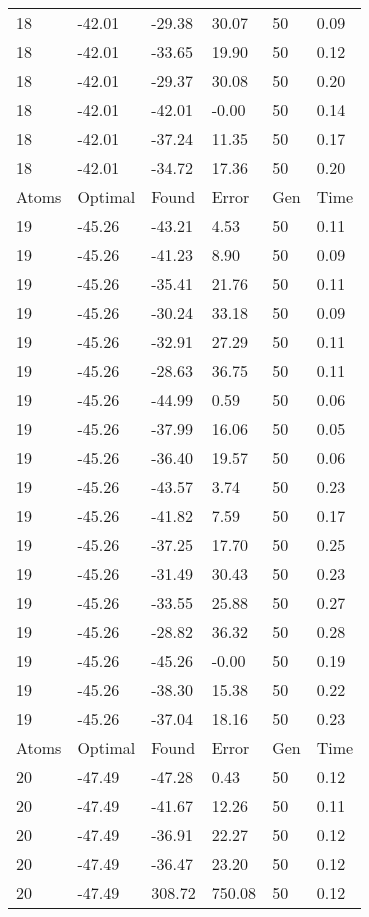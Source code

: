 \documentclass{report}
\begin{document}
\begin{appendix}
\begin{longtable}{llllll}
18 & -42.01 & -29.38 & 30.07 & 50 & 0.09 \\
18 & -42.01 & -33.65 & 19.90 & 50 & 0.12 \\
18 & -42.01 & -29.37 & 30.08 & 50 & 0.20 \\
18 & -42.01 & -42.01 & -0.00 & 50 & 0.14 \\
18 & -42.01 & -37.24 & 11.35 & 50 & 0.17 \\
18 & -42.01 & -34.72 & 17.36 & 50 & 0.20 \\
Atoms & Optimal & Found & Error & Gen & Time \\
19 & -45.26 & -43.21 & 4.53 & 50 & 0.11 \\
19 & -45.26 & -41.23 & 8.90 & 50 & 0.09 \\
19 & -45.26 & -35.41 & 21.76 & 50 & 0.11 \\
19 & -45.26 & -30.24 & 33.18 & 50 & 0.09 \\
19 & -45.26 & -32.91 & 27.29 & 50 & 0.11 \\
19 & -45.26 & -28.63 & 36.75 & 50 & 0.11 \\
19 & -45.26 & -44.99 & 0.59 & 50 & 0.06 \\
19 & -45.26 & -37.99 & 16.06 & 50 & 0.05 \\
19 & -45.26 & -36.40 & 19.57 & 50 & 0.06 \\
19 & -45.26 & -43.57 & 3.74 & 50 & 0.23 \\
19 & -45.26 & -41.82 & 7.59 & 50 & 0.17 \\
19 & -45.26 & -37.25 & 17.70 & 50 & 0.25 \\
19 & -45.26 & -31.49 & 30.43 & 50 & 0.23 \\
19 & -45.26 & -33.55 & 25.88 & 50 & 0.27 \\
19 & -45.26 & -28.82 & 36.32 & 50 & 0.28 \\
19 & -45.26 & -45.26 & -0.00 & 50 & 0.19 \\
19 & -45.26 & -38.30 & 15.38 & 50 & 0.22 \\
19 & -45.26 & -37.04 & 18.16 & 50 & 0.23 \\
Atoms & Optimal & Found & Error & Gen & Time \\
20 & -47.49 & -47.28 & 0.43 & 50 & 0.12 \\
20 & -47.49 & -41.67 & 12.26 & 50 & 0.11 \\
20 & -47.49 & -36.91 & 22.27 & 50 & 0.12 \\
20 & -47.49 & -36.47 & 23.20 & 50 & 0.12 \\
20 & -47.49 & 308.72 & 750.08 & 50 & 0.12 \\

\end{longtable}
\end{appendix}
\end{document}
